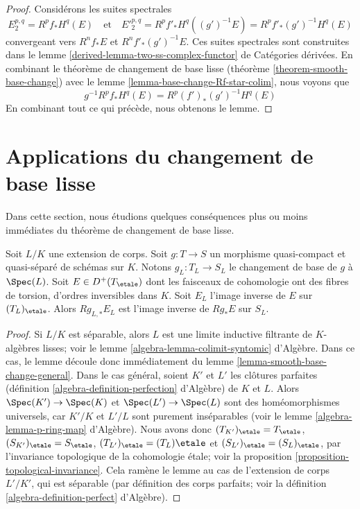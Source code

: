 \begin{proof}
Considérons les suites spectrales
$$
E_2^{p, q} = R^pf_*H^q(E)
\quad\text{et}\quad
{E'}_2^{p, q} = R^pf'_*H^q((g')^{-1}E) = R^pf'_*(g')^{-1}H^q(E)
$$
convergeant vers $R^nf_*E$ et $R^nf'_*(g')^{-1}E$.
Ces suites spectrales sont construites dans le
lemme \ref{derived-lemma-two-ss-complex-functor} de Catégories dérivées.
En combinant le théorème de changement de base lisse
(théorème \ref{theorem-smooth-base-change})
avec le lemme \ref{lemma-base-change-Rf-star-colim}, nous voyons que
$$
g^{-1}R^pf_*H^q(E) = R^p(f')_*(g')^{-1}H^q(E)
$$
En combinant tout ce qui précède, nous obtenons le lemme.
\end{proof}












\section{Applications du changement de base lisse}
\label{section-applications-smooth-base-change}

\noindent
Dans cette section, nous étudions quelques conséquences plus ou moins immédiates
du théorème de changement de base lisse.

\begin{lemma}
\label{lemma-base-change-field-extension}
Soit $L/K$ une extension de corps. Soit $g : T \to S$ un morphisme quasi-compact
et quasi-séparé de schémas sur $K$. Notons
$g_L : T_L \to S_L$ le changement de base de $g$ à $\Spec(L)$.
Soit $E \in D^+(T_\etale)$ dont les faisceaux de cohomologie ont des fibres
de torsion, d'ordres inversibles dans $K$. Soit $E_L$ l'image
inverse de $E$ sur $(T_L)_\etale$. Alors
$Rg_{L, *}E_L$ est l'image inverse de $Rg_*E$ sur $S_L$.
\end{lemma}

\begin{proof}
Si $L/K$ est séparable, alors $L$ est une limite inductive filtrante de
$K$-algèbres lisses; voir le
lemme \ref{algebra-lemma-colimit-syntomic} d'Algèbre.
Dans ce cas, le lemme découle donc immédiatement du
lemme \ref{lemma-smooth-base-change-general}.
Dans le cas général, soient $K'$ et $L'$ les clôtures parfaites
(définition \ref{algebra-definition-perfection} d'Algèbre)
de $K$ et $L$. Alors $\Spec(K') \to \Spec(K)$ et
$\Spec(L') \to \Spec(L)$ sont des homéomorphismes universels,
car $K'/K$ et $L'/L$ sont purement inséparables
(voir le lemme \ref{algebra-lemma-p-ring-map} d'Algèbre).
Nous avons donc $(T_{K'})_\etale = T_\etale$,
$(S_{K'})_\etale = S_\etale$,
$(T_{L'})_\etale = (T_L)\etale$ et
$(S_{L'})_\etale = (S_L)_\etale$, par
l'invariance topologique de la cohomologie étale; voir la
proposition \ref{proposition-topological-invariance}.
Cela ramène le lemme au cas de l'extension de corps
$L'/K'$, qui est séparable (par définition des
corps parfaits; voir la définition \ref{algebra-definition-perfect} d'Algèbre).
\end{proof}

